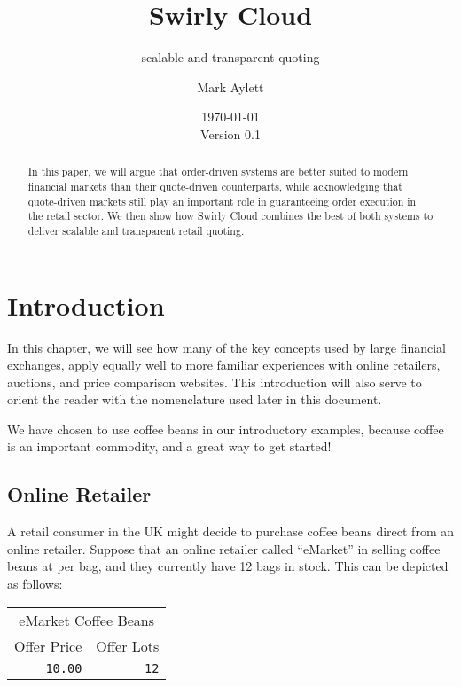 \documentclass[12pt,a4paper,notitlepage,bibliography=totoc]{scrreprt}
\newcommand{\swirly}{Swirly Cloud}
\newcommand{\s}{\textsterling}
\begin{document}
\title{Swirly Cloud}
\subtitle{scalable and transparent quoting}
\author{Mark Aylett}
\date{\today\\Version 0.1}
\maketitle

\begin{abstract}

In this paper, we will argue that \gls{order-driven} systems are better suited to modern financial
\glspl{market} than their \gls{quote-driven} counterparts, while acknowledging that
\gls{quote-driven} \glspl{market} still play an important role in guaranteeing \gls{order} execution
in the retail sector. We then show how \swirly{} combines the best of both systems to deliver
scalable and transparent retail quoting.

\end{abstract}

\tableofcontents

\chapter{Introduction}

In this chapter, we will see how many of the key concepts used by large financial \glspl{exchange},
apply equally well to more familiar experiences with online retailers, \glspl{auction}, and
price comparison websites. This introduction will also serve to orient the reader with the
nomenclature used later in this document.

We have chosen to use coffee beans in our introductory examples, because coffee is an important
commodity, and a great way to get started!

\section{Online Retailer}

A retail consumer in the UK might decide to purchase coffee beans direct from an online
retailer. Suppose that an online retailer called ``eMarket'' in selling coffee beans at \s10.00 per
bag, and they currently have 12 bags in stock. This can be depicted as follows:

\vspace{5mm}
\begin{tabular}{rr}
\multicolumn{2}{c}{eMarket Coffee Beans}\\
Offer Price&Offer Lots\\
\hline
\texttt{10.00}&\texttt{12}\\
\end{tabular}
\vspace{5mm}
\end{document}
